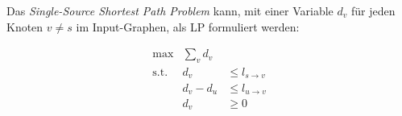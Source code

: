 \documentclass{uebung_cs}
\begin{document}
\begin{aufgabe}
%
%
	Das \emph{Single-Source Shortest Path Problem} kann, mit einer Variable $d_v$ für jeden Knoten $v \neq s$ im Input-Graphen, als \acs{LP} formuliert werden:
	
	\[
		\begin{array}{rrl}
			\text{max}   &  \sum_{v} d_v & 	   \\
			\text{s.t.}  &		   d_v & \leq l_{s \rightarrow v} \\
						 &	 d_v - d_u & \leq l_{u \rightarrow v} \\
						 &	       d_v & \geq 0
		\end{array}
	\]
	

\end{aufgabe}
\end{document}
